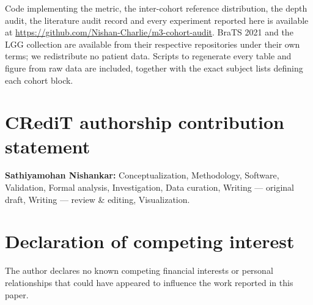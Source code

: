 \documentclass[preprint,12pt,authoryear]{elsarticle}
\begin{document}
Code implementing the metric, the inter-cohort reference distribution, the
depth audit, the literature audit record and
every experiment reported here is available at
\url{https://github.com/Nishan-Charlie/m3-cohort-audit}. BraTS 2021
\citep{baid2021rsna} and the LGG collection \citep{buda2019association} are
available from their respective repositories under their own terms; we
redistribute no patient data. Scripts to regenerate every table and figure from
raw data are included, together with the exact subject lists defining each
cohort block.

\section*{CRediT authorship contribution statement}

\textbf{Sathiyamohan Nishankar:} Conceptualization, Methodology, Software,
Validation, Formal analysis, Investigation, Data curation, Writing --- original
draft, Writing --- review \& editing, Visualization.

\section*{Declaration of competing interest}

The author declares no known competing financial interests or personal
relationships that could have appeared to influence the work reported in this
paper.



\end{document}
